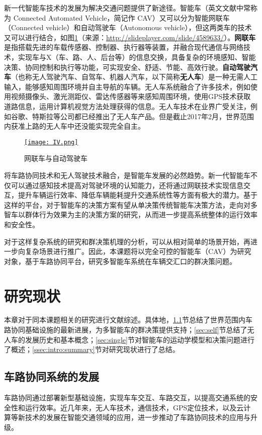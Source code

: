 新一代智能车技术的发展为解决交通问题提供了新途径。智能车（英文文献中常称为 Connected Automated Vehicle，简记作 CAV）又可以分为智能网联车（Connected vehicle）和自动驾驶车（Autonomous vehicle），但这两类车的技术又可以进行结合，如图\ref{fig:IV}（来源：\url{http://slideplayer.com/slide/4589633/}）。\textbf{网联车} 是指搭载先进的车载传感器、控制器、执行器等装置，并融合现代通信与网络技术，实现车与X（车、路、人、后台等）的信息交换，具备复杂的环境感知、智能决策、协同控制和执行等功能，可实现安全、舒适、节能、高效行驶。\textbf{自动驾驶汽车}（也称无人驾驶汽车、自驾车、机器人汽车\cite{Thrun2010Toward}，以下简称\textbf{无人车}）是一种无需人工输入，能够感知周围环境并自主导航的车辆。无人车系统融合了许多技术，例如使用视频摄像头、激光测距仪、雷达传感器等来感知周围环境，使用GPS技术获取道路信息，运用计算机视觉方法处理获得的信息。无人车技术在业界广受关注，例如谷歌\cite{google2017self}、特斯拉\cite{tesla2017model}等公司都已经推出了无人车产品。但是截止2017年2月，世界范围内获准上路的无人车中还没能实现完全自主。

\begin{figure}
\centering
\href{http://slideplayer.com/slide/4589633/}{\texttt{[image: IV.png]}}
\caption{网联车与自动驾驶车}
\label{fig:IV}
\end{figure}

将车路协同技术和无人驾驶技术融合，是智能车发展的必然趋势。新一代智能车不仅可以通过感知技术提高对驾驶环境的认知能力，还将通过网联技术实现信息交互，提升车辆运行效率、降低车辆能耗提升交通系统性等方面有极大的潜力。基于这样的平台，对于智能车的决策方案有望从单决策传统智能车决策方法，走向对多智车以群体行为效果为主的决策方案的研究，从而进一步提高系统整体的运行效率和安全性。

对于这样复杂系统的研究和群决策机理的分析，可以从相对简单的场景开始，再进一步向复杂场景进行推广。因此，本课题将以完全可控的智能车（CAV）为研究对象，基于车路协同平台，研究多智能车系统在车辆交汇口的群决策问题。

\section{研究现状}
本章对于同本课题相关的研究进行文献综述。具体地，\ref{sec:VIC}节总结了世界范围内车路协同基础设施的最新进展，为多智能车的群决策提供支持；\ref{sec:self}节总结了无人车的发展历史和基本概念；\ref{sec:single}节对智能车的运动学模型和决策问题进行了概述；\ref{ssec:intro:summary}节对研究现状进行了总结。

\subsection{车路协同系统的发展}
\label{sec:VIC}
车路协同通过部署新型基础设施，实现车车交互、车路交互，以提高交通系统的安全性和运行效率。近几年来，无人车技术，通信技术，GPS定位技术，以及云计算等新技术的发展在智能交通领域的应用，进一步推动了车路协同技术的应用与升级。

